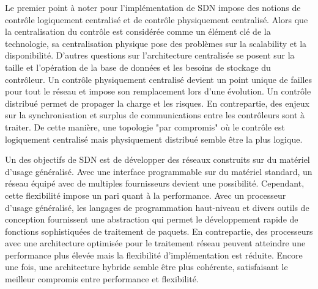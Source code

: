Le premier point à noter pour l'implémentation de SDN impose des notions de contrôle logiquement centralisé et de contrôle physiquement centralisé. Alors que la centralisation du contrôle est considérée comme un élément clé de la technologie, sa centralisation physique pose des problèmes sur la \gls{scalability} et la disponibilité. D'autres questions sur l'architecture centralisée se posent sur la taille et l'opération de la base de données et les besoins de stockage du contrôleur. Un contrôle physiquement centralisé devient un point unique de failles pour tout le réseau et impose son remplacement lors d'une évolution. Un contrôle distribué permet de propager la charge et les risques. En contrepartie, des enjeux sur la synchronisation et surplus de communications entre les contrôleurs sont à traiter. De cette manière, une topologie "par compromis" où le contrôle est logiquement centralisé mais physiquement distribué semble être la plus logique. \cite{sdnbookControlDataPlanes} \cite{SurveySDNArchi}



Un des objectifs de SDN est de développer des réseaux construits sur du matériel d'usage généralisé. Avec une interface programmable sur du matériel standard, un réseau équipé avec de multiples fournisseurs devient une possibilité. Cependant, cette flexibilité impose un pari quant à la performance. Avec un processeur d'usage généralisé, les langages de programmation haut-niveau et divers outils de conception fournissent une abstraction qui permet le développement rapide de fonctions sophistiquées de traitement de paquets. En contrepartie, des processeurs avec une architecture optimisée pour le traitement réseau peuvent atteindre une performance plus élevée mais la flexibilité d'implémentation est réduite. Encore une fois, une architecture hybride semble être plus cohérente, satisfaisant le meilleur compromis entre performance et flexibilité. \cite{ImplementationKeyChallenges}



